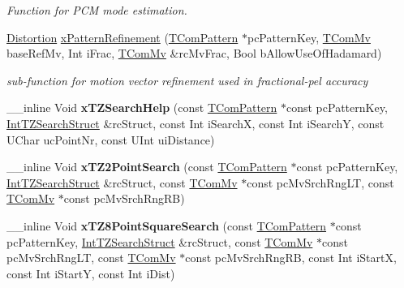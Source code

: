 \begin{DoxyCompactItemize}
\begin{DoxyCompactList}\small\item\em Function for P\+CM mode estimation. \end{DoxyCompactList}\item 
\mbox{\label{class_t_enc_search_a4d091f305579aa4358f20753ad883ebe}} 
\hyperlink{_type_def_8h_aed82b23ef6849d0bc3d95c92102d5b50}{Distortion} \hyperlink{class_t_enc_search_a4d091f305579aa4358f20753ad883ebe}{x\+Pattern\+Refinement} (\hyperlink{class_t_com_pattern}{T\+Com\+Pattern} $\ast$pc\+Pattern\+Key, \hyperlink{class_t_com_mv}{T\+Com\+Mv} base\+Ref\+Mv, Int i\+Frac, \hyperlink{class_t_com_mv}{T\+Com\+Mv} \&rc\+Mv\+Frac, Bool b\+Allow\+Use\+Of\+Hadamard)
\begin{DoxyCompactList}\small\item\em sub-\/function for motion vector refinement used in fractional-\/pel accuracy \end{DoxyCompactList}\item 
\mbox{\label{class_t_enc_search_a7f7634c3239c74c5ea27f1fc21e26c9b}} 
\+\_\+\+\_\+inline Void {\bfseries x\+T\+Z\+Search\+Help} (const \hyperlink{class_t_com_pattern}{T\+Com\+Pattern} $\ast$const pc\+Pattern\+Key, \hyperlink{struct_t_enc_search_1_1_int_t_z_search_struct}{Int\+T\+Z\+Search\+Struct} \&rc\+Struct, const Int i\+SearchX, const Int i\+SearchY, const U\+Char uc\+Point\+Nr, const U\+Int ui\+Distance)
\item 
\mbox{\label{class_t_enc_search_af4f6e4db0236e10de2c9fb617fd9d2ee}} 
\+\_\+\+\_\+inline Void {\bfseries x\+T\+Z2\+Point\+Search} (const \hyperlink{class_t_com_pattern}{T\+Com\+Pattern} $\ast$const pc\+Pattern\+Key, \hyperlink{struct_t_enc_search_1_1_int_t_z_search_struct}{Int\+T\+Z\+Search\+Struct} \&rc\+Struct, const \hyperlink{class_t_com_mv}{T\+Com\+Mv} $\ast$const pc\+Mv\+Srch\+Rng\+LT, const \hyperlink{class_t_com_mv}{T\+Com\+Mv} $\ast$const pc\+Mv\+Srch\+Rng\+RB)
\item 
\mbox{\label{class_t_enc_search_acbe2042bddda88473d76d482eee5a2e7}} 
\+\_\+\+\_\+inline Void {\bfseries x\+T\+Z8\+Point\+Square\+Search} (const \hyperlink{class_t_com_pattern}{T\+Com\+Pattern} $\ast$const pc\+Pattern\+Key, \hyperlink{struct_t_enc_search_1_1_int_t_z_search_struct}{Int\+T\+Z\+Search\+Struct} \&rc\+Struct, const \hyperlink{class_t_com_mv}{T\+Com\+Mv} $\ast$const pc\+Mv\+Srch\+Rng\+LT, const \hyperlink{class_t_com_mv}{T\+Com\+Mv} $\ast$const pc\+Mv\+Srch\+Rng\+RB, const Int i\+StartX, const Int i\+StartY, const Int i\+Dist)

\end{DoxyCompactItemize}
